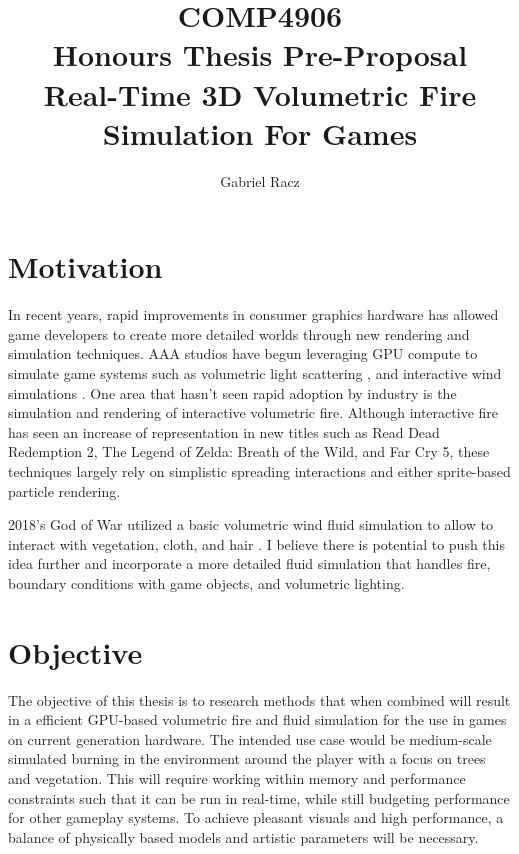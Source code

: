\documentclass[a4paper, 11pt, titlepage]{article}
\title{COMP4906\\
Honours Thesis Pre-Proposal\\
Real-Time 3D Volumetric Fire Simulation For Games}
\author{Gabriel Racz}
\begin{document}
 \maketitle

\section{Motivation}
In recent years, rapid improvements in consumer graphics hardware has allowed game
developers to create more detailed worlds through new rendering and simulation
techniques. AAA studios have begun leveraging GPU compute to simulate game
systems such as volumetric light scattering \cite{RDR2}, and interactive wind
simulations \cite{GOW}. One area that hasn't seen rapid adoption by industry is
the simulation and rendering of interactive volumetric fire. Although
interactive fire has seen an increase of representation in new titles such as Read
Dead Redemption 2, The Legend of Zelda: Breath of the Wild, and Far Cry 5, these
techniques largely rely on simplistic spreading interactions and either sprite-based
particle rendering.

2018's God of War utilized a basic volumetric wind fluid simulation to allow to
interact with vegetation, cloth, and hair \cite{GOW}. I believe
there is potential to push this idea further and incorporate a more
detailed fluid simulation that handles fire, boundary conditions with game
objects, and volumetric lighting.

\section{Objective}
The objective of this thesis is to research methods that when combined will
result in a efficient GPU-based volumetric fire and fluid simulation for
the use in games on current generation hardware. The intended use case would be
medium-scale simulated burning in the environment around the player with a focus
on trees and vegetation.
 This will require working
within memory and performance constraints such that it can be run in
real-time, while still budgeting performance for other gameplay systems. To
achieve pleasant visuals and high performance, a balance of physically based
models and artistic parameters will be necessary. 
\end{document}

